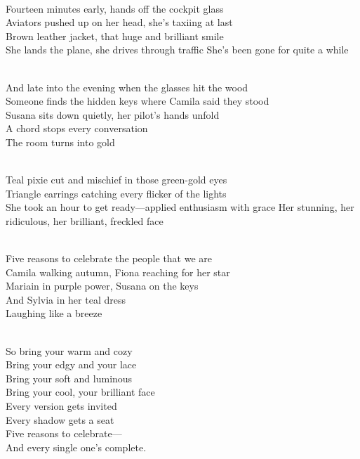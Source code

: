 \begin{lyrics}
\\
Fourteen minutes early, hands off the cockpit glass\\
Aviators pushed up on her head, she's taxiing at last\\
Brown leather jacket, that huge and brilliant smile\\
She lands the plane, she drives through traffic
 She's been gone for quite a while

\\
And late into the evening when the glasses hit the wood\\
Someone finds the hidden keys where Camila said they stood\\
Susana sits down quietly, her pilot's hands unfold\\
A chord stops every conversation\\
The room turns into gold

\\
Teal pixie cut and mischief in those green-gold eyes\\
Triangle earrings catching every flicker of the lights\\
She took an hour to get ready—applied enthusiasm with grace
 Her stunning, her ridiculous, her brilliant, freckled face

\\
Five reasons to celebrate the people that we are\\
Camila walking autumn, Fiona reaching for her star\\
Mariain in purple power, Susana on the keys\\
And Sylvia in her teal dress\\
Laughing like a breeze

\\
So bring your warm and cozy\\
Bring your edgy and your lace\\
Bring your soft and luminous\\
Bring your cool, your brilliant face\\
Every version gets invited\\
Every shadow gets a seat\\
Five reasons to celebrate—\\
And every single one's complete.
\end{lyrics}
